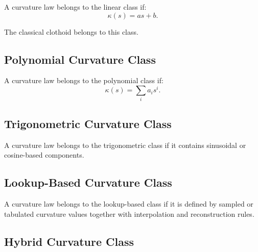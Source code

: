 \begin{definition}
\label{def:linear-curvature-class}
A curvature law belongs to the linear class if:
\[
\kappa(s)=a s+b.
\]
\end{definition}

The classical clothoid belongs to this class.


\subsection{Polynomial Curvature Class}

\begin{definition}
\label{def:polynomial-curvature-class}
A curvature law belongs to the polynomial class if:
\[
\kappa(s)
=
\sum_i a_i s^i.
\]
\end{definition}


\subsection{Trigonometric Curvature Class}

\begin{definition}
\label{def:trigonometric-curvature-class}
A curvature law belongs to the trigonometric class if it contains
sinusoidal or cosine-based components.
\end{definition}


\subsection{Lookup-Based Curvature Class}

\begin{definition}
\label{def:lookup-curvature-class}
A curvature law belongs to the lookup-based class if it is defined by
sampled or tabulated curvature values together with interpolation and
reconstruction rules.
\end{definition}


\subsection{Hybrid Curvature Class}

